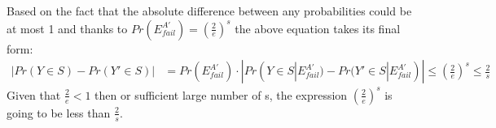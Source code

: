 \documentclass[11pt]{537homework}
\begin{document}
Based on the fact that the absolute difference between any probabilities could be at most 1 and thanks to $Pr(E_{fail}^{A'}) = (\frac{2}{e})^s$ the above equation takes its final form:
\begin{align*}
|Pr(Y\in S) - Pr(Y'\in S)| 
 &= Pr(E_{fail}^{A'}) \cdot |Pr(Y \in S | E_{fail}^{A'}) - Pr(Y' \in S | E_{fail}^{A'})| \leq (\frac{2}{e})^s \leq \frac{2}{s}
\end{align*}
Given that $\frac{2}{e} < 1$  then or sufficient large number of s, the expression $(\frac{2}{e})^s$ is going to be less than $\frac{2}{s}$.
\end{document}
